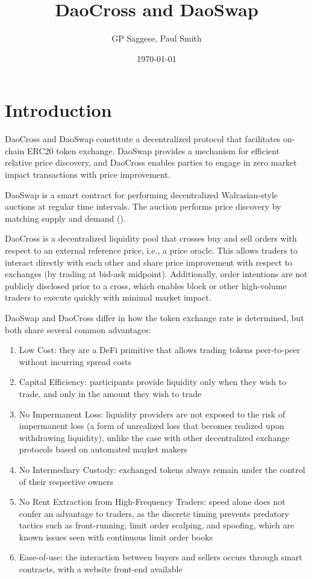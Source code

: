 \documentclass[11pt, reqno]{amsart}
\title{DaoCross and DaoSwap}
\author{GP Saggese, Paul Smith}
\begin{document}
\date{\today}

\maketitle

\tableofcontents


\section{Introduction}

DaoCross and DaoSwap constitute a decentralized protocol that facilitates
on-chain ERC20 token exchange. DaoSwap provides a mechanism for efficient
relative price discovery, and DaoCross enables parties to engage in
zero market impact transactions with price improvement.

DaoSwap is a smart contract for performing decentralized Walrasian-style
auctions at regular time intervals. The auction performs price discovery by
matching supply and demand (\cite{Wa}).

DaoCross is a decentralized liquidity pool that crosses buy and sell orders
with respect to an external reference price, i.e., a price oracle. This allows
traders to interact directly with each other and share price improvement with
respect to exchanges (by trading at bid-ask midpoint). Additionally, order
intentions are not publicly disclosed prior to a cross, which enables block or
other high-volume traders to execute quickly with minimal market impact.

DaoSwap and DaoCross differ in how the token exchange rate is determined, but
both share several common advantages:
\begin{enumerate}
    \item Low Cost:
        they are a DeFi primitive that allows trading tokens peer-to-peer
        without incurring spread costs
    \item Capital Efficiency:
        participants provide liquidity only when
        they wish to trade, and only in the amount they wish to trade
    \item No Impermanent Loss:
        liquidity providers are not exposed to the risk of impermanent loss
        (a form of unrealized loss that becomes realized upon withdrawing
        liquidity), unlike the case with other decentralized exchange protocols
        based on automated market makers
    \item No Intermediary Custody:
        exchanged tokens always remain under the control of their respective
        owners
    \item No Rent Extraction from High-Frequency Traders:
        speed alone does not confer an advantage to traders, as the discrete
        timing prevents predatory tactics such as front-running, limit order
        scalping, and spoofing, which are known issues seen with continuous
        limit order books
    \item Ease-of-use: the interaction between buyers and sellers occurs
        through smart contracts, with a website front-end available
\end{enumerate}
\end{document}
